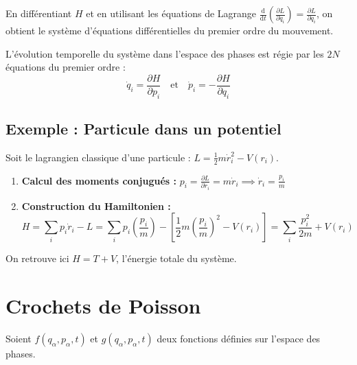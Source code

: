 \documentclass[french]{yLectureNote}
\newcommand{\dd}{\mathrm{d}}
\begin{document}
En différentiant $H$ et en utilisant les équations de Lagrange $\frac{\dd}{\dd t}\left(\frac{\partial L}{\partial \dot{q}_i}\right) = \frac{\partial L}{\partial q_i}$, on obtient le système d'équations différentielles du premier ordre du mouvement.

\begin{theorem}
L'évolution temporelle du système dans l'espace des phases est régie par les $2N$ équations du premier ordre :
\begin{equation}
    \dot{q}_i = \frac{\partial H}{\partial p_i} \quad \text{et} \quad \dot{p}_i = -\frac{\partial H}{\partial q_i}
\end{equation}
\end{theorem}


\subsection{Exemple : Particule dans un potentiel}
Soit le lagrangien classique d'une particule : $L = \frac{1}{2}m\dot{r}_i^2 - V(r_i)$.
\begin{enumerate}
    \item \textbf{Calcul des moments conjugués :} $p_i = \frac{\partial L}{\partial \dot{r}_i} = m\dot{r}_i \implies \dot{r}_i = \frac{p_i}{m}$
    \item \textbf{Construction du Hamiltonien :} 
    \begin{equation}
        H = \sum_i p_i \dot{r}_i - L = \sum_i p_i \left(\frac{p_i}{m}\right) - \left[\frac{1}{2}m\left(\frac{p_i}{m}\right)^2 - V(r_i)\right] = \sum_i \frac{p_i^2}{2m} + V(r_i)
    \end{equation}
\end{enumerate}
On retrouve ici $H = T + V$, l'énergie totale du système.

\section{Crochets de Poisson}

Soient $f(q_\alpha, p_\alpha, t)$ et $g(q_\alpha, p_\alpha, t)$ deux fonctions définies sur l'espace des phases.
\end{document}
